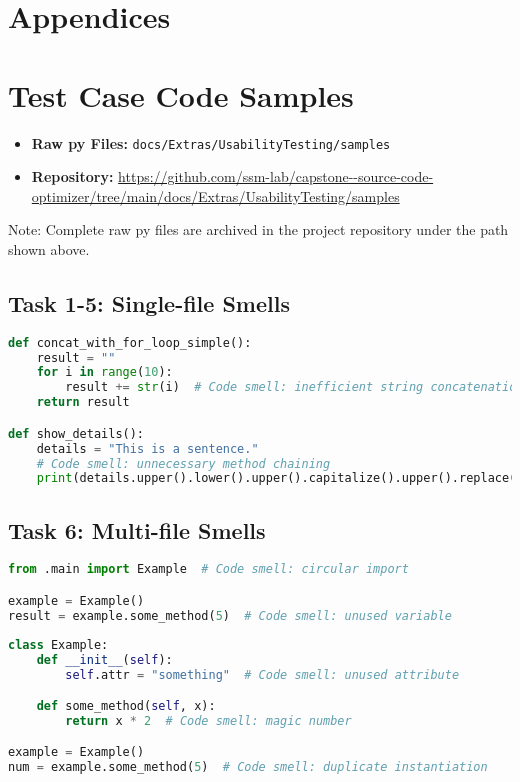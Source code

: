 \documentclass{article}
\begin{document}
\newpage
\section*{Appendices}

\section{Test Case Code Samples}
\label{app:code}


\begin{itemize}
    \item \textbf{Raw py Files:} \texttt{docs/Extras/UsabilityTesting/samples}
    \item \textbf{Repository:} \url{https://github.com/ssm-lab/capstone--source-code-optimizer/tree/main/docs/Extras/UsabilityTesting/samples}
\end{itemize}

\noindent
\footnotesize{Note: Complete raw py files are archived in the project repository under the path shown above.}


\subsection{Task 1-5: Single-file Smells}
\begin{lstlisting}[language=Python,caption={String Manipulation Smells (sample.py)},label=lst:task15]
def concat_with_for_loop_simple():
    result = ""
    for i in range(10):
        result += str(i)  # Code smell: inefficient string concatenation
    return result

def show_details():
    details = "This is a sentence."
    # Code smell: unnecessary method chaining
    print(details.upper().lower().upper().capitalize().upper().replace("|", "-"))
\end{lstlisting}

\subsection{Task 6: Multi-file Smells}
\begin{lstlisting}[language=Python,caption={Extra1 File (extra1.py)},label=lst:task6a]
from .main import Example  # Code smell: circular import

example = Example()
result = example.some_method(5)  # Code smell: unused variable
\end{lstlisting}

\begin{lstlisting}[language=Python,caption={DMain File (main.py)},label=lst:task6b]
class Example:
    def __init__(self):
        self.attr = "something"  # Code smell: unused attribute

    def some_method(self, x):
        return x * 2  # Code smell: magic number

example = Example()
num = example.some_method(5)  # Code smell: duplicate instantiation
\end{lstlisting}
\end{document}
